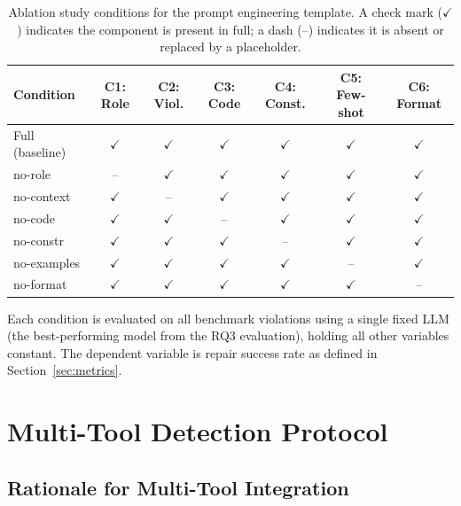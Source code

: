 \begin{table}[htbp]
\caption{Ablation study conditions for the prompt engineering template.
  A check mark ($\checkmark$) indicates the component is present in full;
  a dash (--) indicates it is absent or replaced by a placeholder.}
\label{tab:ablation}
\centering\small
\renewcommand{\arraystretch}{1.2}
\begin{tabular}{lcccccc}
\toprule
\textbf{Condition} & \textbf{C1: Role} & \textbf{C2: Viol.}
  & \textbf{C3: Code} & \textbf{C4: Const.} & \textbf{C5: Few-shot}
  & \textbf{C6: Format} \\
\midrule
Full (baseline) & $\checkmark$ & $\checkmark$ & $\checkmark$
  & $\checkmark$ & $\checkmark$ & $\checkmark$ \\
\textsf{no-role}      & --           & $\checkmark$ & $\checkmark$
  & $\checkmark$ & $\checkmark$ & $\checkmark$ \\
\textsf{no-context}   & $\checkmark$ & --           & $\checkmark$
  & $\checkmark$ & $\checkmark$ & $\checkmark$ \\
\textsf{no-code}      & $\checkmark$ & $\checkmark$ & --
  & $\checkmark$ & $\checkmark$ & $\checkmark$ \\
\textsf{no-constr}    & $\checkmark$ & $\checkmark$ & $\checkmark$
  & --           & $\checkmark$ & $\checkmark$ \\
\textsf{no-examples}  & $\checkmark$ & $\checkmark$ & $\checkmark$
  & $\checkmark$ & --           & $\checkmark$ \\
\textsf{no-format}    & $\checkmark$ & $\checkmark$ & $\checkmark$
  & $\checkmark$ & $\checkmark$ & -- \\
\bottomrule
\end{tabular}
\end{table}

\noindent
Each condition is evaluated on all benchmark violations using a single fixed
LLM (the best-performing model from the RQ3 evaluation), holding all other
variables constant.  The dependent variable is repair success rate as defined
in Section~\ref{sec:metrics}.

\section{Multi-Tool Detection Protocol}
\label{sec:detection_protocol}

\subsection{Rationale for Multi-Tool Integration}

